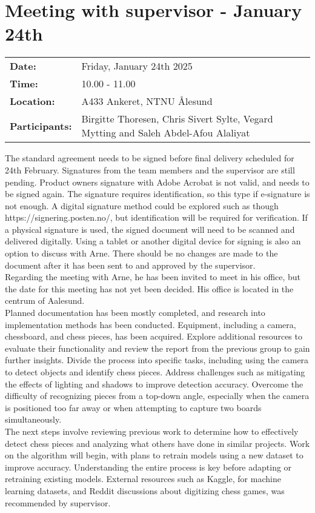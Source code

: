 \section{Meeting with supervisor - January 24th}
\begin{tabular}{ll}
    \textbf{Date:} & Friday, January 24th 2025 \\
    \textbf{Time:} & 10.00 - 11.00\\
    \textbf{Location:} & A433 Ankeret, NTNU Ålesund \\
    \textbf{Participants:} & Birgitte Thoresen, Chris Sivert Sylte, Vegard Mytting and Saleh Abdel-Afou Alaliyat\\
\end{tabular}

\vspace{0.5cm}

The standard agreement needs to be signed before final delivery scheduled for 24th February. Signatures from the team members and the supervisor are still pending. Product owners signature with Adobe Acrobat is not valid, and needs to be signed again. The signature requires identification, so this type if e-signature is not enough. A digital signature method could be explored such as though https://signering.posten.no/, but identification will be required for verification. If a physical signature is used, the signed document will need to be scanned and delivered digitally. Using a tablet or another digital device for signing is also an option to discuss with Arne. There should be no changes are made to the document after it has been sent to and approved by the supervisor.\\

Regarding the meeting with Arne, he has been invited to meet in his office, but the date for this meeting has not yet been decided. His office is located in the centrum of Aalesund. \\

Planned documentation has been mostly completed, and research into implementation methods has been conducted. Equipment, including a camera, chessboard, and chess pieces, has been acquired. Explore additional resources to evaluate their functionality and review the report from the previous group to gain further insights. Divide the process into specific tasks, including using the camera to detect objects and identify chess pieces. Address challenges such as mitigating the effects of lighting and shadows to improve detection accuracy. Overcome the difficulty of recognizing pieces from a top-down angle, especially when the camera is positioned too far away or when attempting to capture two boards simultaneously. \\

The next steps involve reviewing previous work to determine how to effectively detect chess pieces and analyzing what others have done in similar projects. Work on the algorithm will begin, with plans to retrain models using a new dataset to improve accuracy. Understanding the entire process is key before adapting or retraining existing models. External resources such as Kaggle, for machine learning datasets, and Reddit discussions about digitizing chess games, was recommended by supervisor.